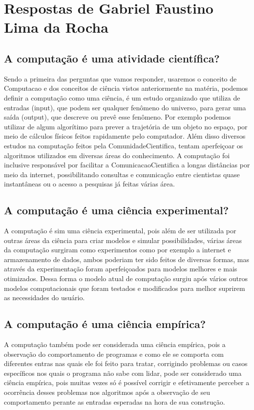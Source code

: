 \section{Respostas de Gabriel Faustino Lima da Rocha}

\subsection{A computação é uma atividade científica?}

Sendo a primeira das perguntas que vamos responder, usaremos o conceito de \gls{Computacao} e dos conceitos de ciência vistos anteriormente na matéria, podemos definir a computação como uma ciência, é um estudo organizado que utiliza de entradas (input), que podem ser qualquer fenômeno do universo, para gerar uma saída (output), que descreve ou prevê esse fenômeno. Por exemplo podemos utilizar de algum algorítimo para prever a trajetória de um objeto no espaço, por meio de cálculos físicos feitos rapidamente pelo computador. Além disso diversos estudos na computação feitos pela \gls{ComunidadeCientifica}, tentam aperfeiçoar os algoritmos utilizados em diversas áreas do conhecimento. A computação foi inclusive responsável por facilitar a \gls{ComunicacaoCientifica} a longas distâncias por meio da internet, possibilitando consultas e comunicação entre cientistas quase instantâneas ou o acesso a pesquisas já feitas várias área. 
\subsection{A computação é uma ciência experimental?}
A computação é sim uma ciência experimental, pois além de ser utilizada por outras áreas da ciência para criar modelos e simular possibilidades, várias áreas da computação surgiram como experimentos como por exemplo a internet e armazenamento de dados, ambos poderiam ter sido feitos de diversas formas, mas através da experimentação foram aperfeiçoados para modelos melhores e mais otimizados. Dessa forma o modelo atual de computação surgiu após vários outros modelos computacionais que foram testados e modificados para melhor suprirem as necessidades do usuário.

\subsection{A computação é uma ciência empírica?}
A computação também pode ser considerada uma ciência empírica, pois a observação do comportamento de programas e como ele se comporta com diferentes entras nas quais ele foi feito para tratar, corrigindo problemas ou casos específicos nos quais o programa não sabe com lidar, pode ser considerado uma ciência empírica, pois muitas vezes só é possível corrigir e efetivamente perceber a ocorrência desses problemas nos algoritmos após a observação de seu comportamento perante as entradas esperadas na hora de sua construção.